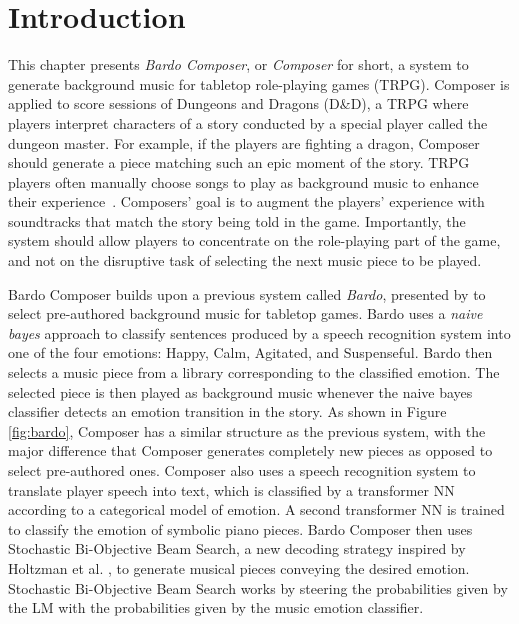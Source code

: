\section{Introduction}

This chapter presents \textit{Bardo Composer}, or \textit{Composer} for short, a system to generate background music for tabletop role-playing games (TRPG). Composer is applied to score sessions of Dungeons and Dragons (D\&D), a TRPG where players interpret characters of a story conducted by a special player called the dungeon master. For example, if the players are fighting a dragon, Composer should generate a piece matching such an epic moment of the story. TRPG players often manually choose songs to play as background music to enhance their experience~\cite{bergstrom2014case}. Composers' goal is to augment the players' experience with soundtracks that match the story being told in the game. Importantly, the system should allow players to concentrate on the role-playing part of the game, and not on the disruptive task of selecting the next music piece to be played.

Bardo Composer builds upon a previous system called \textit{Bardo}, presented by \citet{padovani2017} to select pre-authored background music for tabletop games. Bardo uses a \textit{naive bayes} approach to classify sentences produced by a speech recognition system into one of the four emotions: Happy, Calm, Agitated, and Suspenseful. Bardo then selects a music piece from a library corresponding to the classified emotion. The selected piece is then played as background music whenever the naive bayes classifier detects an emotion transition in the story. As shown in Figure \ref{fig:bardo}, Composer has a similar structure as the previous system, with the major difference that Composer generates completely new pieces as opposed to select pre-authored ones. Composer also uses a speech recognition system to translate player speech into text, which is classified by a transformer NN according to a categorical model of emotion. A second transformer NN is trained to classify the emotion of symbolic piano pieces. Bardo Composer then uses Stochastic Bi-Objective Beam Search, a new decoding strategy inspired by Holtzman et al. \cite{holtzman2018learning}, to generate musical pieces conveying the desired emotion. Stochastic Bi-Objective Beam Search works by steering the probabilities given by the LM with the probabilities given by the music emotion classifier.

